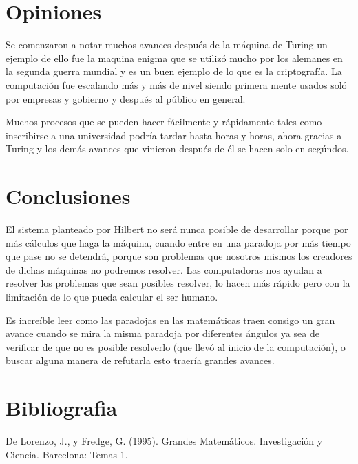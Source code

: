 \documentclass{article}
\begin{document}
\section{Opiniones}
Se comenzaron a notar muchos avances después de la máquina de Turing un ejemplo de ello fue la maquina enigma que se utilizó mucho por los alemanes en la segunda guerra mundial y es un buen ejemplo de lo que es la criptografía. La computación fue escalando más y más de nivel siendo primera mente usados soló por empresas y gobierno y después al público en general.
\vspace{10pt}

Muchos procesos que se pueden hacer fácilmente y rápidamente tales como inscribirse a una universidad podría tardar hasta horas y horas, ahora gracias a Turing y los demás avances que vinieron después de él se hacen solo en segúndos.

\section{Conclusiones}

El sistema planteado por Hilbert no será nunca posible de desarrollar  porque por más cálculos que haga la máquina, cuando entre en una paradoja por más tiempo que pase no se detendrá, porque son problemas que nosotros mismos los creadores de dichas máquinas no podremos resolver. Las computadoras nos ayudan a resolver los problemas que sean posibles resolver, lo hacen más rápido pero con la limitación de lo que pueda calcular el ser humano.

\vspace{10pt}

Es increíble leer como las paradojas en las matemáticas traen consigo un gran avance cuando se mira la misma paradoja por diferentes ángulos ya sea de verificar de que no es posible resolverlo (que llevó al inicio de la computación), o buscar alguna manera de refutarla esto traería grandes avances. 

\vspace{10pt}

\begin{center}
\end{center}

\section{Bibliografia}
De Lorenzo, J., y Fredge, G. (1995). Grandes Matemáticos. Investigación y Ciencia. Barcelona: Temas 1.
\vspace{10pt}
\end{document}

